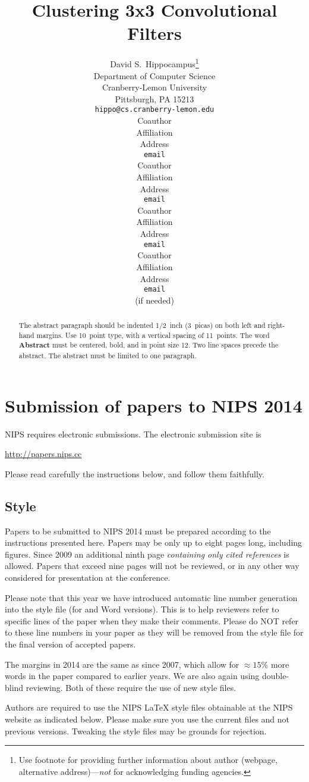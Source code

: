 \documentclass{article} %
\title{Clustering 3x3 Convolutional Filters}
\author{
David S.~Hippocampus\thanks{ Use footnote for providing further information
about author (webpage, alternative address)---\emph{not} for acknowledging
funding agencies.} \\
Department of Computer Science\\
Cranberry-Lemon University\\
Pittsburgh, PA 15213 \\
\texttt{hippo@cs.cranberry-lemon.edu} \\
\And
Coauthor \\
Affiliation \\
Address \\
\texttt{email} \\
\AND
Coauthor \\
Affiliation \\
Address \\
\texttt{email} \\
\And
Coauthor \\
Affiliation \\
Address \\
\texttt{email} \\
\And
Coauthor \\
Affiliation \\
Address \\
\texttt{email} \\
(if needed)\\
}
\begin{document}
\maketitle

\begin{abstract}
The abstract paragraph should be indented 1/2~inch (3~picas) on both left and
right-hand margins. Use 10~point type, with a vertical spacing of 11~points.
The word \textbf{Abstract} must be centered, bold, and in point size 12. Two
line spaces precede the abstract. The abstract must be limited to one
paragraph.
\end{abstract}

\section{Submission of papers to NIPS 2014}

NIPS requires electronic submissions.  The electronic submission site is  
\begin{center}
   \url{http://papers.nips.cc}
\end{center}

Please read carefully the
instructions below, and follow them faithfully.
\subsection{Style}

Papers to be submitted to NIPS 2014 must be prepared according to the
instructions presented here. Papers may be only up to eight pages long,
including figures. Since 2009 an additional ninth page \textit{containing only
cited references} is allowed. Papers that exceed nine pages will not be
reviewed, or in any other way considered for presentation at the conference.

Please note that this year we have introduced automatic line number generation
into the style file (for \LaTeXe and Word versions). This is to help reviewers
refer to specific lines of the paper when they make their comments. Please do
NOT refer to these line numbers in your paper as they will be removed from the
style file for the final version of accepted papers.

The margins in 2014 are the same as since 2007, which allow for $\approx 15\%$
more words in the paper compared to earlier years. We are also again using 
double-blind reviewing. Both of these require the use of new style files.

Authors are required to use the NIPS \LaTeX{} style files obtainable at the
NIPS website as indicated below. Please make sure you use the current files and
not previous versions. Tweaking the style files may be grounds for rejection.
\end{document}

